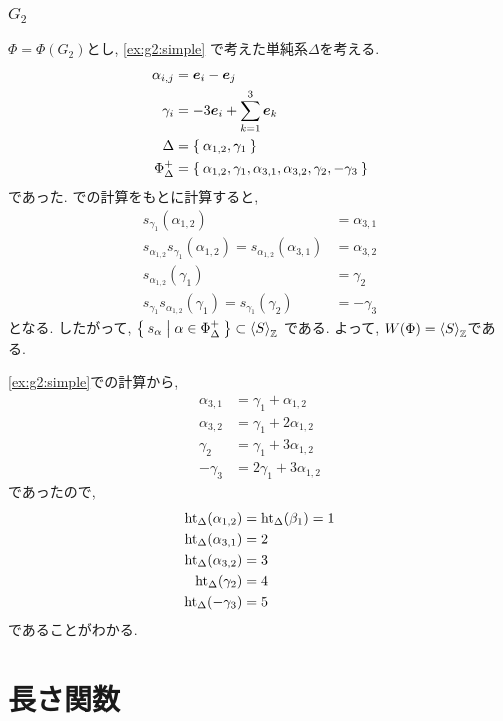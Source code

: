\subsection{$G_2$}
$\Phi=\Phi(G_2)$とし,
\cref{ex:g2:simple}
で考えた単純系$\Delta$を考える.
\begin{align*}
  \alpha_{i,j}&=\boldsymbol{e}_i-\boldsymbol{e}_j\\
  \gamma_{i}&=-3\boldsymbol{e}_i+\sum_{k=1}^{3}\boldsymbol{e}_k\\
  \Delta&=\Set{\alpha_{1,2},\gamma_{1}}\\
  \Phi_\Delta^+ 
&=\Set{ \alpha_{1,2},\gamma_{1}, \alpha_{3,1},\alpha_{3,2},\gamma_{2},-\gamma_3}
\end{align*}
であった. での計算をもとに計算すると,
\begin{align*}
  s_{\gamma_{1}}(\alpha_{1,2})&=\alpha_{3,1}\\
  s_{\alpha_{1,2}}s_{\gamma_{1}}(\alpha_{1,2})=
  s_{\alpha_{1,2}}(\alpha_{3,1})&=\alpha_{3,2}\\
  s_{\alpha_{1,2}}(\gamma_1)&=\gamma_{2}\\
  s_{\gamma_{1}}s_{\alpha_{1,2}}(\gamma_1)=
  s_{\gamma_{1}}(\gamma_2)&=-\gamma_{3}
\end{align*}
となる.  したがって, $\Set{s_\alpha |\alpha\in\Phi_\Delta^+}\subset\Braket{S}_{\mathbb{Z}}$
である.
よって, $W(\Phi)=\Braket{S}_{\mathbb{Z}}$である.


\cref{ex:g2:simple}での計算から,
\begin{align*}
\alpha_{3,1}&=  \gamma_{1}+\alpha_{1,2}\\
\alpha_{3,2}&=  \gamma_{1}+2\alpha_{1,2}\\
\gamma_{2}&= \gamma_{1}+3\alpha_{1,2}\\
-\gamma_3&= 2\gamma_{1}+3\alpha_{1,2}
\end{align*}
であったので,
\begin{align*}
  \operatorname{ht}_\Delta(\alpha_{1,2})&=\operatorname{ht}_\Delta(\beta_{1})=1\\
  \operatorname{ht}_\Delta(\alpha_{3,1})&=  2\\
  \operatorname{ht}_\Delta(\alpha_{3,2})&=  3\\
  \operatorname{ht}_\Delta(\gamma_{2})&= 4\\
  \operatorname{ht}_\Delta(-\gamma_3)&= 5
\end{align*}
であることがわかる.


\chapter{長さ関数}


